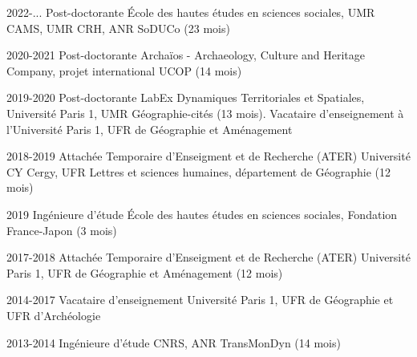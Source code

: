 

\begin{cvskills}

  \cvskill
    {2022-...} %
    {Post-doctorante} %
    {École des hautes études en sciences sociales, UMR CAMS, UMR CRH, ANR SoDUCo (23 mois)} %

  \cvskill
    {2020-2021} %
    {Post-doctorante} %
    {Archaïos - Archaeology, Culture and Heritage Company, projet international UCOP (14 mois)} %

  \cvskill
    {2019-2020} %
    {Post-doctorante} %
    {LabEx Dynamiques Territoriales et Spatiales, Université Paris 1, UMR Géographie-cités (13 mois). Vacataire d'enseignement à l'Université Paris 1, UFR de Géographie et Aménagement} %

  \cvskill
    {2018-2019} %
    {Attachée Temporaire d'Enseigment et de Recherche (ATER)} %
    {Université CY Cergy, UFR Lettres et sciences humaines, département de Géographie (12 mois)} %

  \cvskill
    {2019} %
    {Ingénieure d'étude} %
    {École des hautes études en sciences sociales, Fondation France-Japon (3 mois)} %

  \cvskill
    {2017-2018} %
    {Attachée Temporaire d'Enseigment et de Recherche (ATER)} %
    {Université Paris 1, UFR de Géographie et Aménagement (12 mois)} %

  \cvskill
    {2014-2017} %
    {Vacataire d'enseignement} %
    {Université Paris 1, UFR de Géographie et UFR d'Archéologie} %

  \cvskill
    {2013-2014} %
    {Ingénieure d'étude} %
    {CNRS, ANR TransMonDyn (14 mois)} %


\end{cvskills}
